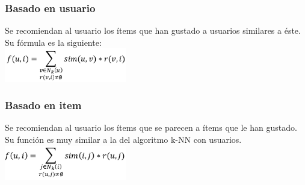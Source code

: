  	 \subsubsection{Basado en usuario}
 	 	Se recomiendan al usuario los ítems que han gustado a usuarios similares a éste. Su fórmula es la siguiente: \\
 	 	\includegraphics[width=0.4\textwidth]{images/knn_user}

 	 \subsubsection{Basado en item}
 	 	Se recomiendan al usuario los ítems que se parecen a ítems que le han gustado. Su función es muy similar a la del algoritmo k-NN con usuarios.\\
 	 	\includegraphics[width=0.4\textwidth]{images/knn_item}
 	 
